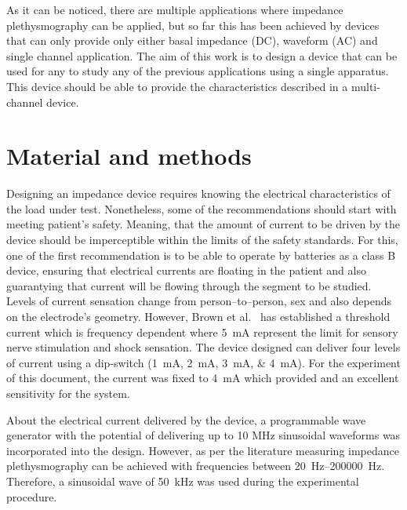 As it can be noticed, there are multiple applications where impedance plethysmography can be applied, but so far this has been achieved by devices that can only provide only either basal impedance (DC), waveform (AC) and single channel application. The aim of this work is to design a device that can be used for any to study any of the previous applications using a single apparatus. This device should be able to provide the characteristics described in a multi-channel device.  

\section{Material and methods}
Designing an impedance device requires knowing the electrical characteristics of the load under test. Nonetheless, some of the recommendations should start with meeting patient's safety. Meaning, that the amount of current to be driven by the device should be imperceptible within the limits of the safety standards. For this, one of the first recommendation is to be able to operate by batteries as a class B device, ensuring that electrical currents are floating in the patient and also guarantying that current will be flowing through the segment to be studied. Levels of current sensation change from person–to–person, sex and also depends on the electrode's geometry. However, Brown et al.~\cite{brown1998medical} has established a threshold current which is frequency dependent where \SI{5}{\mA} represent the limit for sensory nerve stimulation and shock sensation. The device designed can deliver four levels of current using a dip-switch (\SIlist{1;2;3;4}{\mA}). For the experiment of this document, the current was fixed to \SI{4}{\mA} which provided and an excellent sensitivity for the system. 

About the electrical current delivered by the device, a programmable wave generator with the potential of delivering up to 10 MHz sinusoidal waveforms was incorporated into the design. However, as per the literature measuring impedance plethysmography can be achieved with frequencies between \SIrange[scientific-notation = engineering]{20}{200000}{\hertz}. Therefore, a sinusoidal wave of \SI{50}{\kilo\hertz} was used during the experimental procedure.

